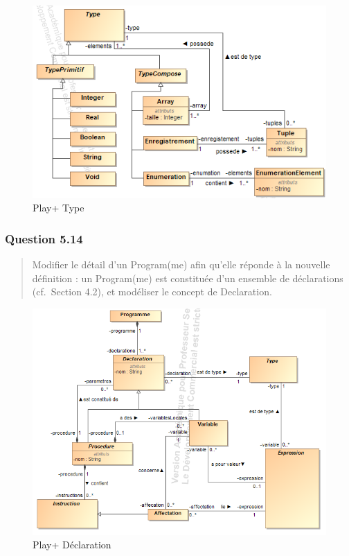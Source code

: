 \documentclass[]{article}
\begin{document}
\begin{figure}
\centering
\includegraphics{./images_final/Play+Q13.png}
\caption{Play+ Type}
\end{figure}

\hypertarget{question-5.14}{%
\subsubsection{Question 5.14}\label{question-5.14}}

\begin{quote}
Modifier le détail d'un Program(me) afin qu'elle réponde à la nouvelle
définition : un Program(me) est constituée d'un ensemble de déclarations
(cf.~Section 4.2), et modéliser le concept de Declaration.
\end{quote}

\begin{figure}
\centering
\includegraphics{./images_final/Play+Q14.png}
\caption{Play+ Déclaration}
\end{figure}
\end{document}
